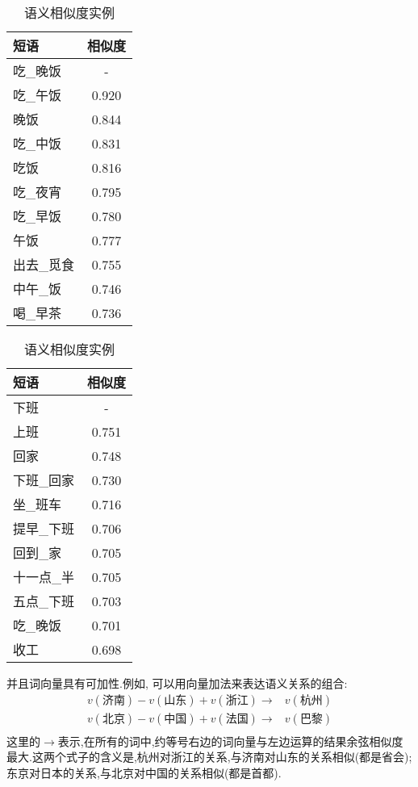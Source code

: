 \begin{table}[h]
\begin{subtable}{0.3\textwidth}
	\begin{tabular}{|l|c|} 
	\hline
	{\heiti 短语} & {\heiti 相似度} \\
	\hline
	吃\_晚饭 & - \\
	\hline
	吃\_午饭 & 0.920 \\
	\hline
	晚饭 & 0.844 \\
	\hline
	吃\_中饭 & 0.831 \\
	\hline
	吃饭 & 0.816 \\
	\hline
	吃\_夜宵 & 0.795 \\
	\hline
	吃\_早饭 & 0.780 \\
	\hline
	午饭 & 0.777 \\
	\hline
	出去\_觅食 & 0.755 \\
	\hline
	中午\_饭 & 0.746 \\
	\hline
	喝\_早茶 & 0.736 \\
	\hline
	\end{tabular}
\end{subtable}
\hspace{1em}
\begin{subtable}{0.3\textwidth}
	\begin{tabular}{|l|c|} 
	\hline
	{\heiti 短语} & {\heiti 相似度} \\
	\hline
	下班 & - \\
	\hline
	上班 & 0.751 \\
	\hline
	回家 & 0.748 \\
	\hline
	下班\_回家 & 0.730 \\
	\hline
	坐\_班车 & 0.716 \\
	\hline
	提早\_下班 & 0.706 \\
	\hline
	回到\_家 & 0.705 \\
	\hline
	十一点\_半 & 0.705 \\
	\hline
	五点\_下班 & 0.703 \\
	\hline
	吃\_晚饭 & 0.701 \\
	\hline
	收工 & 0.698 \\
	\hline
	\end{tabular}
\end{subtable}

\caption{语义相似度实例}
\label{table:similarity_instance}
\end{table}

并且词向量具有可加性.例如, 可以用向量加法来表达语义关系的组合:
\begin{align*}
	v(\text{济南}) - v(\text{山东}) + v(\text{浙江}) \rightarrow & v(\text{杭州}) \\
	v(\text{北京}) - v(\text{中国}) + v(\text{法国}) \rightarrow & v(\text{巴黎}) \\
\end{align*}
这里的$\rightarrow$表示,在所有的词中,约等号右边的词向量与左边运算的结果余弦相似度最大.这两个式子的含义是,杭州对浙江的关系,与济南对山东的关系相似(都是省会); 东京对日本的关系,与北京对中国的关系相似(都是首都).

